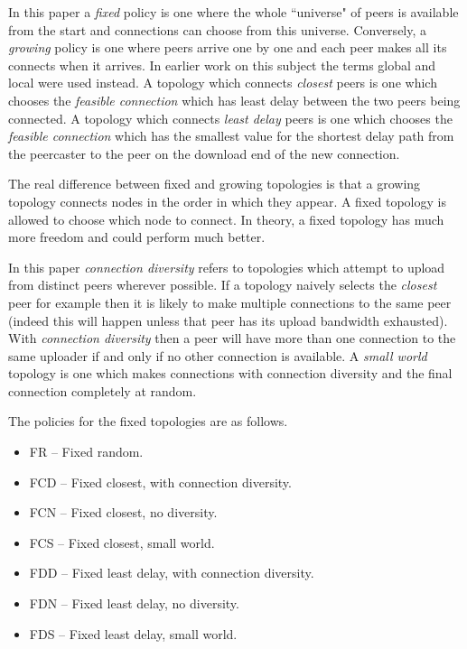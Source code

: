 In this paper a {\em fixed\/} policy is one where the whole ``universe" of
peers is available from the start and connections can choose from this
universe.  Conversely, a {\em growing\/} policy is one where peers 
arrive one by one and each peer makes all its connects when it arrives.
In earlier work on this subject 
\cite{ukpew} 
the terms global and local were used instead.  
A topology which connects {\em closest\/} peers is one which chooses 
the {\em feasible connection\/} which has least delay between the two
peers being connected.  A topology which
connects {\em least delay\/} peers is one which chooses the
{\em feasible connection\/} which has the smallest value for the
shortest delay path from the peercaster to the peer on the download
end of the new connection.

\begin{remark}
The real difference between fixed and growing topologies is that a growing 
topology connects nodes in the order in which they appear.  A fixed topology
is allowed to choose which node to connect.  In theory, a fixed
topology has much more freedom and could perform much better.
\end{remark}

In this paper {\em connection diversity\/} refers to topologies which attempt to upload 
from distinct peers wherever possible.  If a topology naively selects the {\em closest\/}
peer for example then it is likely to make multiple connections to the same peer (indeed 
this will happen unless that peer has its upload bandwidth exhausted).  With {\em
connection diversity\/} then a peer will have more than one connection to the same uploader
if and only if no other connection is available.  A {\em small world\/} topology is one which 
makes  connections with connection diversity and the final connection completely at random.

The policies for the fixed topologies are as follows.
\begin{itemize}
\item FR -- Fixed random.
\item FCD -- Fixed closest, with connection diversity.
\item FCN -- Fixed closest, no diversity.
\item FCS -- Fixed closest, small world.
\item FDD -- Fixed least delay, with connection diversity.
\item FDN -- Fixed least delay, no diversity.
\item FDS -- Fixed least delay, small world.
\end{itemize}

